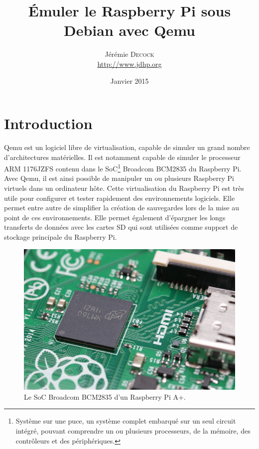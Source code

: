 \documentclass{article}
\title{Émuler le Raspberry Pi sous Debian avec Qemu}
\author{Jérémie \textsc{Decock} \\ \url{http://www.jdhp.org}}
\date{Janvier 2015}
\begin{document}
\maketitle

\tableofcontents


\section*{Introduction}\label{sec:intro}

Qemu est un logiciel libre de virtualisation, capable de simuler un grand
nombre d'architectures matérielles.
Il est notamment capable de simuler le processeur ARM 1176JZFS contenu dans
le SoC\footnote{Système sur une puce, un système complet embarqué sur un seul
circuit intégré, pouvant comprendre un ou plusieurs processeurs, de la mémoire,
des contrôleurs et des périphériques.} Broadcom BCM2835 du Raspberry Pi.
Avec Qemu, il est ainsi possible de manipuler un ou plusieurs Raspberry Pi
virtuels dans un ordinateur hôte.
Cette virtualisation du Raspberry Pi est très utile pour configurer et tester
rapidement des environnements logiciels.
Elle permet entre autre de simplifier la création de sauvegardes lors de la
mise au point de ces environnements.
Elle permet également d'épargner les longs transferts de données avec les cartes SD
qui sont utilisées comme support de stockage principale du Raspberry Pi.

\begin{figure}
    \centering
    \ifpdf
    \includegraphics[width=.70\linewidth]{fig/bcm2835.jpeg}
    \else
    \fi
    \caption{\label{fig:bcm2835}Le SoC Broadcom BCM2835 d'un Raspberry Pi A+.} %
\end{figure}
\end{document}
